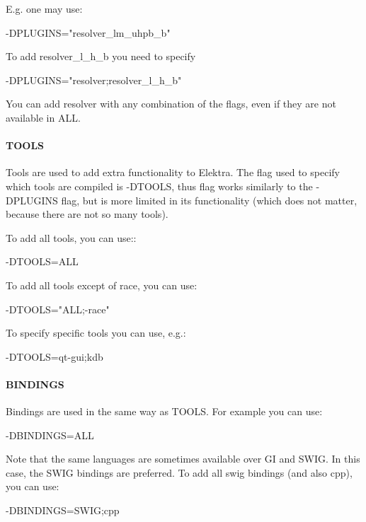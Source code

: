 E.\+g. one may use\+: \begin{DoxyVerb}    -DPLUGINS="resolver_lm_uhpb_b"
\end{DoxyVerb}


To add resolver\+\_\+l\+\_\+h\+\_\+b you need to specify \begin{DoxyVerb}    -DPLUGINS="resolver;resolver_l_h_b"
\end{DoxyVerb}


You can add resolver with any combination of the flags, even if they are not available in {\ttfamily A\+L\+L}.

\paragraph*{T\+O\+O\+L\+S}

Tools are used to add extra functionality to Elektra. The flag used to specify which tools are compiled is {\ttfamily -\/\+D\+T\+O\+O\+L\+S}, thus flag works similarly to the {\ttfamily -\/\+D\+P\+L\+U\+G\+I\+N\+S} flag, but is more limited in its functionality (which does not matter, because there are not so many tools).

To add all tools, you can use\+:\+: \begin{DoxyVerb}    -DTOOLS=ALL
\end{DoxyVerb}


To add all tools except of race, you can use\+: \begin{DoxyVerb}    -DTOOLS="ALL;-race"
\end{DoxyVerb}


To specify specific tools you can use, e.\+g.\+: \begin{DoxyVerb}    -DTOOLS=qt-gui;kdb
\end{DoxyVerb}


\paragraph*{B\+I\+N\+D\+I\+N\+G\+S}

Bindings are used in the same way as T\+O\+O\+L\+S. For example you can use\+: \begin{DoxyVerb}    -DBINDINGS=ALL
\end{DoxyVerb}


Note that the same languages are sometimes available over G\+I and S\+W\+I\+G. In this case, the S\+W\+I\+G bindings are preferred. To add all swig bindings (and also cpp), you can use\+: \begin{DoxyVerb}    -DBINDINGS=SWIG;cpp
\end{DoxyVerb}


